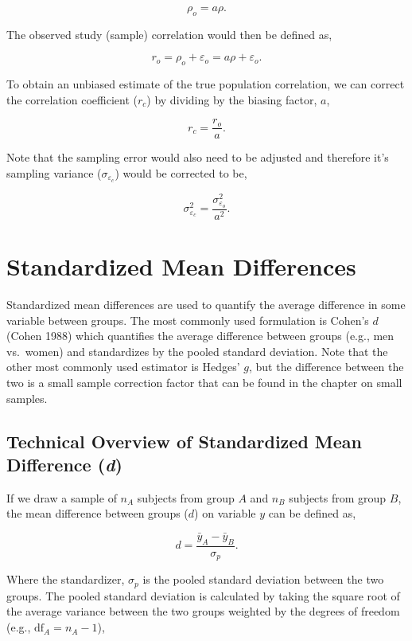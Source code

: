 \documentclass[
  letterpaper,
  DIV=11,
  numbers=noendperiod]{scrreprt}
\begin{document}
\[
\rho_o = a\rho.
\]

The observed study (sample) correlation would then be defined as,

\[
r_o = \rho_o + \varepsilon_o = a\rho + \varepsilon_o.
\]

To obtain an unbiased estimate of the true population correlation, we
can correct the correlation coefficient (\(r_c\)) by dividing by the
biasing factor, \(a\),

\[
r_{c} = \frac{r_o}{a}.
\]

Note that the sampling error would also need to be adjusted and
therefore it's sampling variance (\(\sigma_{\varepsilon_c}\)) would be
corrected to be,

\[
\sigma^2_{\varepsilon_c} = \frac{\sigma^2_{\varepsilon_o} }{a^2}.
\]

\hypertarget{standardized-mean-differences}{%
\section{Standardized Mean
Differences}\label{standardized-mean-differences}}

Standardized mean differences are used to quantify the average
difference in some variable between groups. The most commonly used
formulation is Cohen's \(d\) (Cohen 1988) which quantifies the average
difference between groups (e.g., men vs.~women) and standardizes by the
pooled standard deviation. Note that the other most commonly used
estimator is Hedges' \(g\), but the difference between the two is a
small sample correction factor that can be found in the chapter on small
samples.

\hypertarget{technical-overview-of-standardized-mean-difference-d}{%
\subsection{\texorpdfstring{Technical Overview of Standardized Mean
Difference
(\emph{d})}{Technical Overview of Standardized Mean Difference (d)}}\label{technical-overview-of-standardized-mean-difference-d}}

If we draw a sample of \(n_A\) subjects from group \(A\) and \(n_B\)
subjects from group \(B\), the mean difference between groups (\(d\)) on
variable \(y\) can be defined as,

\[
d=\frac{\bar{y}_A - \bar{y}_B}{\sigma_p}.
\]

Where the standardizer, \(\sigma_p\) is the pooled standard deviation
between the two groups. The pooled standard deviation is calculated by
taking the square root of the average variance between the two groups
weighted by the degrees of freedom (e.g., \(\text{df}_A=n_A-1\)),
\end{document}
